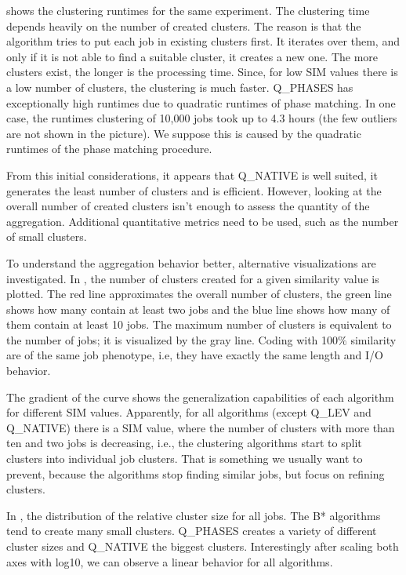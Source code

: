 \documentclass{jhps}
\begin{document}
 shows the clustering runtimes for the same experiment.
The clustering time depends heavily on the number of created clusters.
The reason is that the algorithm tries to put each job in existing clusters first.
It iterates over them, and only if it is not able to find a suitable cluster, it creates a new one.
The more clusters exist, the longer is the processing time.
Since, for low SIM values there is a low number of clusters, the clustering is much faster.
Q\_PHASES has exceptionally high runtimes due to quadratic runtimes of phase matching.
In one case, the runtimes clustering of 10,000 jobs took up to 4.3 hours (the few outliers are not shown in the picture).
We suppose this is caused by the quadratic runtimes of the phase matching procedure.

From this initial considerations, it appears that Q\_NATIVE is well suited, it generates the least number of clusters and is efficient.
However, looking at the overall number of created clusters isn't enough to assess the quantity of the aggregation.
Additional quantitative metrics need to be used, such as the number of small clusters.

\medskip

To understand the aggregation behavior better, alternative visualizations are investigated.
In , the number of clusters created for a given similarity value is plotted.
The red line approximates the overall number of clusters, the green line shows how many contain at least two jobs and the blue line shows how many of them contain at least 10 jobs.
The maximum number of clusters is equivalent to the number of jobs; it is visualized by the gray line.
Coding with 100$\%$  similarity are of the same job phenotype, i.e, they have exactly the same length and I/O behavior.

The gradient of the curve shows the generalization capabilities of each algorithm for different SIM values.
Apparently, for all algorithms (except Q\_LEV and Q\_NATIVE) there is a SIM value, where the number of clusters with more than ten and two jobs is decreasing, i.e., the clustering algorithms start to split clusters into individual job clusters.
That is something we usually want to prevent, because the algorithms stop finding similar jobs, but focus on refining clusters.

\smallskip

In , the distribution of the relative cluster size for all jobs.
The B* algorithms tend to create many small clusters.
Q\_PHASES creates a variety of different cluster sizes and Q\_NATIVE the biggest clusters.
Interestingly after scaling both axes with log10, we can observe a linear behavior for all algorithms.
\end{document}
